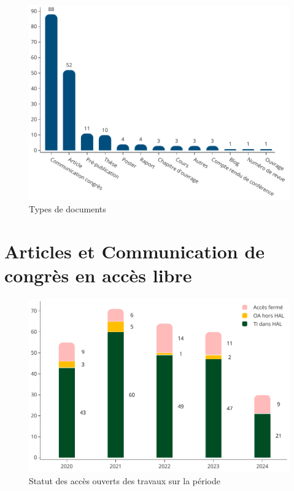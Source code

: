 \documentclass[french, 11pt]{../../dibiso/biso}
\begin{document}
\begin{figure}[!h]
  \includegraphics[width=\textwidth]{figures/document_types.pdf}
  \centering
  \caption{Types de documents}
  \label{fig_doc_type}
\end{figure}


\pagebreak

\section{Articles et Communication de congrès en accès libre} %

\begin{figure}[!h]
  \includegraphics[width=\textwidth]{figures/open_access_works.pdf}
  \caption{Statut des accès ouverts des travaux sur la période \oaworksperiod}
  \label{fig_open_access_works}
\end{figure}
\end{document}
